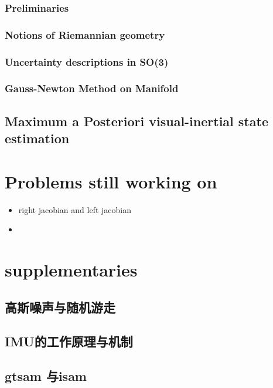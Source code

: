 \documentclass[10pt,a4paper]{article}
\begin{document}
\subsubsection{Preliminaries}
\subsubsection{Notions of Riemannian geometry}
\subsubsection{Uncertainty descriptions in SO(3)}
\subsubsection{Gauss-Newton Method on Manifold}

\subsection{Maximum a Posteriori visual-inertial state estimation}

\section{Problems still working on}
\begin{itemize}
	\item right jacobian and left jacobian
	\item 
\end{itemize}



\section{supplementaries}
\subsection{高斯噪声与随机游走}
\subsection{IMU的工作原理与机制}
\subsection{gtsam 与isam}
\end{document}
